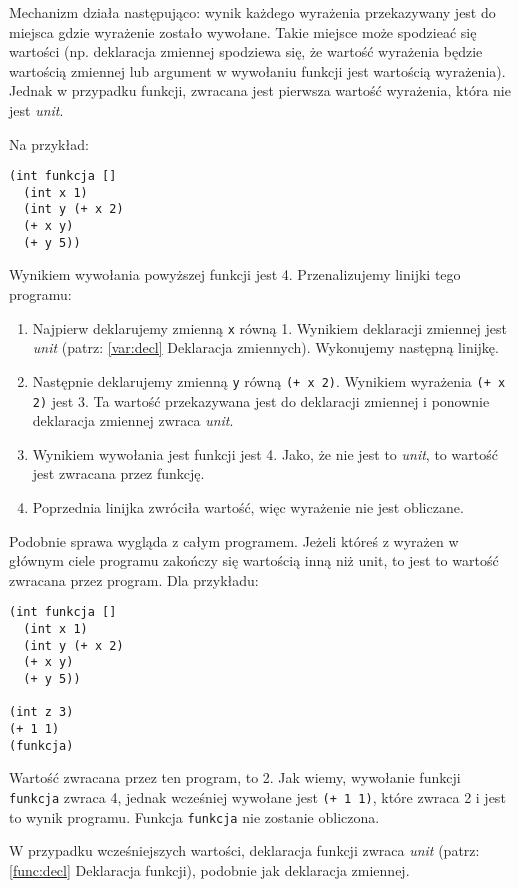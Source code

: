 \documentclass{article}
\begin{document}
Mechanizm działa następująco: wynik każdego wyrażenia przekazywany jest do miejsca gdzie wyrażenie zostało wywołane. Takie miejsce może spodzieać się wartości (np. deklaracja zmiennej spodziewa się, że wartość wyrażenia będzie wartością zmiennej lub argument w wywołaniu funkcji jest wartością wyrażenia). Jednak w przypadku funkcji, zwracana jest pierwsza wartość wyrażenia, która nie jest \textit{unit}.

Na przykład:

\begin{lstlisting}
(int funkcja []
  (int x 1)
  (int y (+ x 2)
  (+ x y)
  (+ y 5))
\end{lstlisting}

Wynikiem wywołania powyższej funkcji jest 4. Przenalizujemy linijki tego programu:

\begin{enumerate}
    \item Najpierw deklarujemy zmienną \texttt{x} równą 1. Wynikiem deklaracji zmiennej jest \textit{unit} (patrz: \ref{var:decl} Deklaracja zmiennych). Wykonujemy następną linijkę.
    \item Następnie deklarujemy zmienną \texttt{y} równą \texttt{(+ x 2)}. Wynikiem wyrażenia \texttt{(+ x 2)} jest 3. Ta wartość przekazywana jest do deklaracji zmiennej i ponownie deklaracja zmiennej zwraca \textit{unit}.
    \item Wynikiem wywołania jest funkcji jest 4. Jako, że nie jest to \textit{unit}, to wartość jest zwracana przez funkcję.
    \item Poprzednia linijka zwróciła wartość, więc wyrażenie nie jest obliczane.
\end{enumerate}

Podobnie sprawa wygląda z całym programem. Jeżeli któreś z wyrażen w głównym ciele programu zakończy się wartością inną niż unit, to jest to wartość zwracana przez program. Dla przykładu:

\begin{lstlisting}
(int funkcja []
  (int x 1)
  (int y (+ x 2)
  (+ x y)
  (+ y 5))

(int z 3)  
(+ 1 1)
(funkcja)
\end{lstlisting}

Wartość zwracana przez ten program, to 2. Jak wiemy, wywołanie funkcji \texttt{funkcja} zwraca 4, jednak wcześniej wywołane jest \texttt{(+ 1 1)}, które zwraca 2 i jest to wynik programu. Funkcja \texttt{funkcja} nie zostanie obliczona.

W przypadku wcześniejszych wartości, deklaracja funkcji zwraca \textit{unit} (patrz: \ref{func:decl} Deklaracja funkcji), podobnie jak deklaracja zmiennej.
\end{document}
